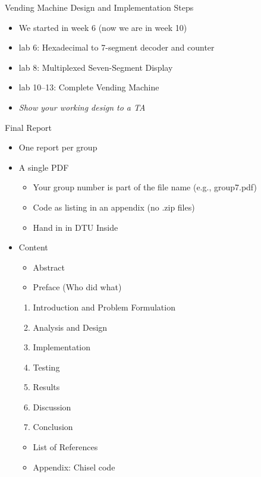 \begin{frame}[fragile]{Vending Machine Design and Implementation Steps}
\begin{itemize}
\item We started in week 6 (now we are in week 10)
\item lab 6: Hexadecimal to 7-segment decoder and counter
\item lab 8: Multiplexed Seven-Segment Display
\item lab 10--13: Complete Vending Machine
\item \emph{Show your working design to a TA}
\end{itemize}
\end{frame}

\begin{frame}[fragile]{Final Report}
\begin{itemize}
\item One report per group
\item A single PDF
\begin{itemize}
\item Your group number is part of the file name (e.g., group7.pdf)
\item Code as listing in an appendix (no .zip files)
\item Hand in in DTU Inside
\end{itemize}
\item Content
\begin{itemize}
\item Abstract
\item Preface (Who did what)
\end{itemize}
\begin{enumerate}
\item Introduction and Problem Formulation
\item Analysis and Design
\item Implementation
\item Testing
\item Results
\item Discussion
\item Conclusion
\end{enumerate}
\begin{itemize}
\item List of References
\item Appendix: Chisel code
\end{itemize}
\end{itemize}
\end{frame}

